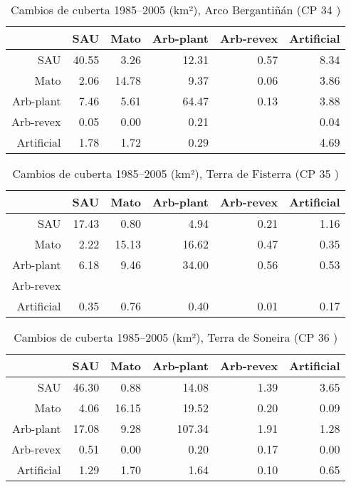 \begin{table}[p]
\centering
\caption{Cambios de cuberta 1985--2005 (km²), Arco Bergantiñán (CP 34 )} 
\label{TaboaContinxCP34}
\begin{tabular}{rrrrrr}
  \hline
 & SAU & Mato & Arb-plant & Arb-revex & Artificial \\ 
  \hline
SAU & 40.55 & 3.26 & 12.31 & 0.57 & 8.34 \\ 
  Mato & 2.06 & 14.78 & 9.37 & 0.06 & 3.86 \\ 
  Arb-plant & 7.46 & 5.61 & 64.47 & 0.13 & 3.88 \\ 
  Arb-revex & 0.05 & 0.00 & 0.21 &  & 0.04 \\ 
  Artificial & 1.78 & 1.72 & 0.29 &  & 4.69 \\ 
   \hline
\end{tabular}
\end{table}
\begin{table}[p]
\centering
\caption{Cambios de cuberta 1985--2005 (km²), Terra de Fisterra (CP 35 )} 
\label{TaboaContinxCP35}
\begin{tabular}{rrrrrr}
  \hline
 & SAU & Mato & Arb-plant & Arb-revex & Artificial \\ 
  \hline
SAU & 17.43 & 0.80 & 4.94 & 0.21 & 1.16 \\ 
  Mato & 2.22 & 15.13 & 16.62 & 0.47 & 0.35 \\ 
  Arb-plant & 6.18 & 9.46 & 34.00 & 0.56 & 0.53 \\ 
  Arb-revex &  &  &  &  &  \\ 
  Artificial & 0.35 & 0.76 & 0.40 & 0.01 & 0.17 \\ 
   \hline
\end{tabular}
\end{table}
\begin{table}[p]
\centering
\caption{Cambios de cuberta 1985--2005 (km²), Terra de Soneira (CP 36 )} 
\label{TaboaContinxCP36}
\begin{tabular}{rrrrrr}
  \hline
 & SAU & Mato & Arb-plant & Arb-revex & Artificial \\ 
  \hline
SAU & 46.30 & 0.88 & 14.08 & 1.39 & 3.65 \\ 
  Mato & 4.06 & 16.15 & 19.52 & 0.20 & 0.09 \\ 
  Arb-plant & 17.08 & 9.28 & 107.34 & 1.91 & 1.28 \\ 
  Arb-revex & 0.51 & 0.00 & 0.20 & 0.17 & 0.00 \\ 
  Artificial & 1.29 & 1.70 & 1.64 & 0.10 & 0.65 \\ 
   \hline
\end{tabular}
\end{table}
